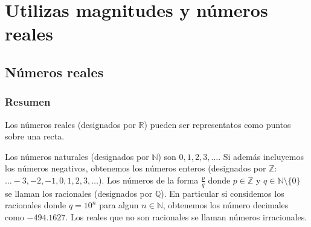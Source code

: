 \chapter{Utilizas magnitudes y números reales}

\section{Números reales}

\subsection*{Resumen}

Los números reales (designados por $\mathbb R$) pueden ser representatos como
puntos sobre una recta.

\begin{center}
\end{center}

Los números naturales (designados por $\mathbb N$) son $0, 1, 2, 3, \ldots$. Si
además incluyemos los números negativos, obtenemos los números enteros
(designados por $\mathbb Z$: $\ldots -3, -2, -1, 0, 1, 2, 3, \ldots$).
Los números de la forma
$\frac{p}{q}$ donde $p \in \mathbb Z$ y $q \in \mathbb N \setminus \{0\}$ se
llaman los racionales (designados por $\mathbb Q$). En particular si considemos
los racionales donde $q=10^n$ para algun $n \in \mathbb N$, obtenemos los
número decimales como $-494.1627$.
Los reales que no son racionales se llaman números irracionales.

\begin{center}
\end{center}

